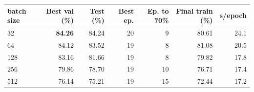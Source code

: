 \begin{tabular}{lrrrrrr}
\toprule
batch size & Best val (\%) & Test (\%) & Best ep. & Ep. to 70\% & Final train (\%) & s/epoch \\
\midrule
32 & \textbf{84.26} & 84.24 & 20 & 9 & 80.61 & 24.1 \\
64 & 84.12 & 83.52 & 19 & 8 & 81.08 & 20.5 \\
128 & 83.16 & 81.66 & 19 & 8 & 79.82 & 17.8 \\
256 & 79.86 & 78.70 & 19 & 10 & 76.71 & 17.4 \\
512 & 76.14 & 75.21 & 19 & 15 & 72.44 & 17.2 \\
\bottomrule
\end{tabular}
